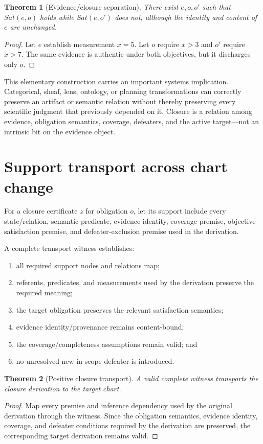 \documentclass[11pt]{article}
\newtheorem{theorem}{Theorem}
\begin{document}
\begin{theorem}[Evidence/closure separation]
There exist $e,o,o'$ such that $Sat(e,o)$ holds while $Sat(e,o')$ does not, although the identity and content of $e$ are unchanged.
\end{theorem}
\begin{proof}
Let $e$ establish measurement $x=5$. Let $o$ require $x>3$ and $o'$ require $x>7$. The same evidence is authentic under both objectives, but it discharges only $o$.
\end{proof}

This elementary construction carries an important systems implication. Categorical, sheaf, lens, ontology, or planning transformations can correctly preserve an artifact or semantic relation without thereby preserving every scientific judgment that previously depended on it. Closure is a relation among evidence, obligation semantics, coverage, defeaters, and the active target—not an intrinsic bit on the evidence object.

\section{Support transport across chart change}
For a closure certificate $z$ for obligation $o$, let its support include every state/relation, semantic predicate, evidence identity, coverage premise, objective-satisfaction premise, and defeater-exclusion premise used in the derivation.

A complete transport witness establishes:
\begin{enumerate}
\item all required support nodes and relations map;
\item referents, predicates, and measurements used by the derivation preserve the required meaning;
\item the target obligation preserves the relevant satisfaction semantics;
\item evidence identity/provenance remains content-bound;
\item the coverage/completeness assumptions remain valid; and
\item no unresolved new in-scope defeater is introduced.
\end{enumerate}

\begin{theorem}[Positive closure transport]
A valid complete witness transports the closure derivation to the target chart.
\end{theorem}
\begin{proof}
Map every premise and inference dependency used by the original derivation through the witness. Since the obligation semantics, evidence identity, coverage, and defeater conditions required by the derivation are preserved, the corresponding target derivation remains valid.
\end{proof}
\end{document}
